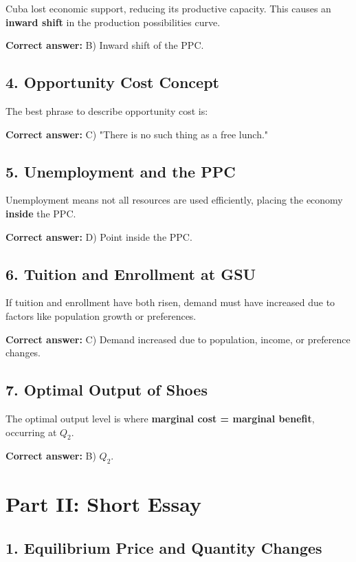 \documentclass{article}
\begin{document}
Cuba lost economic support, reducing its productive capacity. This causes an \textbf{inward shift} in the production possibilities curve.

\textbf{Correct answer:} B) Inward shift of the PPC.

\subsection*{4. Opportunity Cost Concept}

The best phrase to describe opportunity cost is:

\textbf{Correct answer:} C) "There is no such thing as a free lunch."

\subsection*{5. Unemployment and the PPC}

Unemployment means not all resources are used efficiently, placing the economy \textbf{inside} the PPC.

\textbf{Correct answer:} D) Point inside the PPC.

\subsection*{6. Tuition and Enrollment at GSU}

If tuition and enrollment have both risen, demand must have increased due to factors like population growth or preferences.

\textbf{Correct answer:} C) Demand increased due to population, income, or preference changes.

\subsection*{7. Optimal Output of Shoes}

The optimal output level is where \textbf{marginal cost = marginal benefit}, occurring at $Q_2$.

\textbf{Correct answer:} B) $Q_2$.

\section*{Part II: Short Essay}

\subsection*{1. Equilibrium Price and Quantity Changes}
\end{document}
